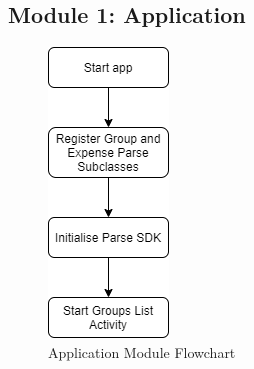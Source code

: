 \documentclass[conference]{IEEEtran}
\begin{document}
\subsection{Module 1: Application}
    \begin{figure}[H]
        \centerline{\includegraphics[scale=0.3]{img/flowcharts/flowchart-module-application.png}}
        \caption{Application Module Flowchart}
        \label{fig:application-module-flowchart}
    \end{figure}
\end{document}
